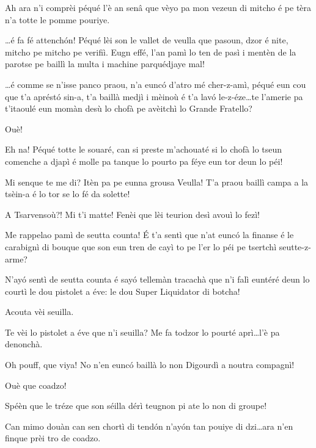 \begin{drama}
\Laurentspeaks Ah ara n'i comprèi péqué l'è an senâ que vèyo pa mon vezeun di mitcho é pe tèra n'a totte le pomme pouriye.

\Pierrespeaks \ldots é fa fé attench\'on! Péqué lèi  son le vallet de veulla que pasoun, dzor é nite, mitcho pe mitcho pe verifiì. Eugn effé, l'an pamì lo ten de pasì i mentèn de la parotse pe baillì la multa i machine parquédjaye mal!

\Laurentspeaks \ldots é comme se n'isse panco praou, n'a eunc\'o d'atro mé cher-z-amì, péqué eun cou que t'a aprést\'o sin-a, t'a baillà medjì i mèinoù é t'a lav\'o le-z-éze\ldots te l'amerie pa t'itaoulé eun mo\-màn desù lo chofà pe avèitchì lo Grande Fratello?

\Pierrespeaks Ouè!

\Laurentspeaks Eh na! Péqué totte le souaré, can si preste m'achouaté si lo chofà lo tseun comenche a djapì é molle pa tanque lo pourto pa féye eun tor deun lo péi!

\Pierrespeaks Mi senque te me di? Itèn pa pe eunna grousa Veulla! T'a praou baillì campa a la tsèin-a é lo tor se lo fé da solette!

\Laurentspeaks A Tsarvensoù?! Mi t'i matte! Fenèi que lèi teurion desì avouì lo fezì!

\Pierrespeaks Me rappelao pamì de seutta counta! \'E t'a sentì que n'at eunc\'o la finanse é le carabignì di bouque que son eun tren de cayì to pe l'er lo péi pe tsertchì seutte-z-arme?

\Laurentspeaks N'ay\'o sentì de seutta counta é say\'o tellemàn tracachà que n'i falì euntéré deun lo courtì le dou pistolet a éve: le dou Super Liquidator di botcha!

\Pierrespeaks Acouta vèi seuilla.


\Pierrespeaks {} Te vèi lo pistolet a éve que n'i seuilla?
Me fa todzor lo pourté aprì\ldots l'è pa denonchà.

\Laurentspeaks Oh pouff, que viya! No n'en eunc\'o baillà lo non Digourdì a noutra compagnì!

\Pierrespeaks Ouè que coadzo!

\Laurentspeaks  Spéèn que le tréze que son séilla dérì  teugnon pi ate lo non di groupe!

\Pierrespeaks Can mimo douàn can sen chortì di tend\'on n'ay\'on tan pouiye di dzi\ldots ara n'en finque prèi tro de coadzo.


\end{drama}
